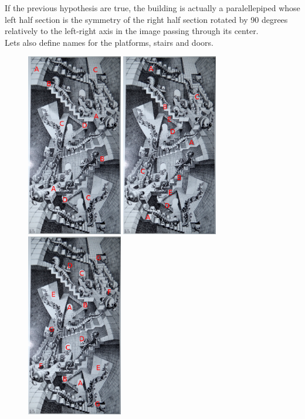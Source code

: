 \documentclass[12pt, a4paper]{article}
\begin{document}
If the previous hypothesis are true, the building is actually a paralellepiped whose left half section is the symmetry of the right half section rotated by 90 degrees relatively to the left-right axis in the image passing through its center.\\

Lets also define names for the platforms, stairs and doors.\\

\begin{center}
\begin{figure}[H]
\centering\includegraphics[height=8cm]{./platformsName.png}
\centering\includegraphics[height=8cm]{./stairsName.png}
\centering\includegraphics[height=8cm]{./doorsName.png}\\
\end{figure}
\end{center}
\end{document}
